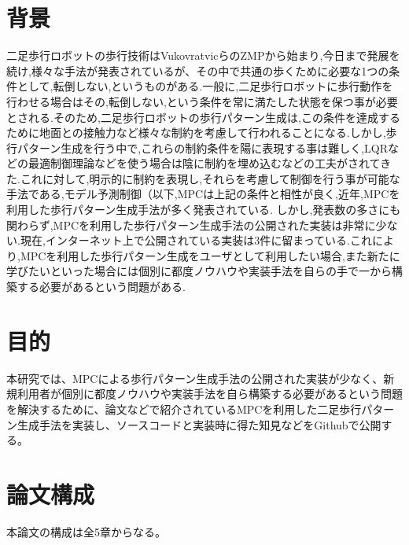 
\section{背景}
二足歩行ロボットの歩行技術はVukovratvicらのZMP\cite{VUKOBRATOVIC19721}から始まり,今日まで発展を続け,様々な手法が発表されているが、その中で共通の歩くために必要な1つの条件として,転倒しない,というものがある.一般に,二足歩行ロボットに歩行動作を行わせる場合はその,転倒しない,という条件を常に満たした状態を保つ事が必要とされる.そのため,二足歩行ロボットの歩行パターン生成は,この条件を達成するために地面との接触力など様々な制約を考慮して行われることになる.しかし,歩行パターン生成を行う中で,これらの制約条件を陽に表現する事は難しく,LQRなどの最適制御理論などを使う場合は陰に制約を埋め込むなどの工夫がされてきた.これに対して,明示的に制約を表現し,それらを考慮して制御を行う事が可能な手法である,モデル予測制御（以下,MPC\cite{MPC}は上記の条件と相性が良く,近年,MPCを利用した歩行パターン生成手法が多く発表されている.
しかし,発表数の多さにも関わらず,MPCを利用した歩行パターン生成手法の公開された実装は非常に少ない.現在,インターネット上で公開されている実装は3件\cite{GITHUB1}\cite{GITHUB2}\cite{GITHUB3}に留まっている.これにより,MPCを利用した歩行パターン生成をユーザとして利用したい場合,また新たに学びたいといった場合には個別に都度ノウハウや実装手法を自らの手で一から構築する必要があるという問題がある.

\section{目的}
本研究では、MPCによる歩行パターン生成手法の公開された実装が少なく、新規利用者が個別に都度ノウハウや実装手法を自ら構築する必要があるという問題を解決するために、論文などで紹介されているMPCを利用した二足歩行パターン生成手法を実装し、ソースコードと実装時に得た知見などをGithub\cite{MYGITHUB}で公開する。

\section{論文構成}
本論文の構成は全5章からなる。


\newpage
